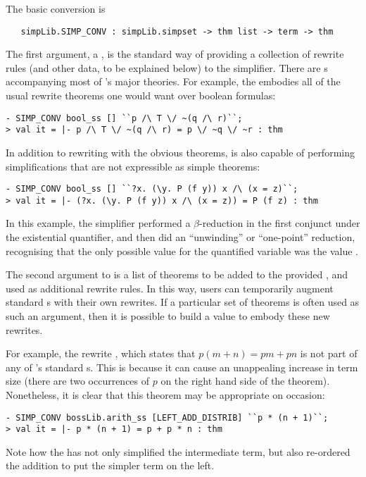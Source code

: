 The basic conversion is
\begin{verbatim}
   simpLib.SIMP_CONV : simpLib.simpset -> thm list -> term -> thm
\end{verbatim}
The first argument, a \simpset, is the standard way of providing a
collection of rewrite rules (and other data, to be explained below) to
the simplifier.  There are \simpset{}s accompanying most of \HOL's
major theories.  For example, the \simpset{} 
embodies all of the usual rewrite theorems one would want over boolean
formulas:
\setcounter{sessioncount}{0}
\begin{session}
\begin{verbatim}
- SIMP_CONV bool_ss [] ``p /\ T \/ ~(q /\ r)``;
> val it = |- p /\ T \/ ~(q /\ r) = p \/ ~q \/ ~r : thm
\end{verbatim}
\end{session}
In addition to rewriting with the obvious theorems,  is
also capable of performing simplifications that are not expressible as
simple theorems:
\begin{session}
\begin{verbatim}
- SIMP_CONV bool_ss [] ``?x. (\y. P (f y)) x /\ (x = z)``;
> val it = |- (?x. (\y. P (f y)) x /\ (x = z)) = P (f z) : thm
\end{verbatim}
\end{session}
In this example, the simplifier performed a $\beta$-reduction in the
first conjunct under the existential quantifier, and then did an
``unwinding'' or ``one-point'' reduction, recognising that the only
possible value for the quantified variable  was the value
.

The second argument to  is a list of theorems to be
added to the provided \simpset, and used as additional rewrite rules.
In this way, users can temporarily augment standard \simpset{}s with
their own rewrites.  If a particular set of theorems is often used as
such an argument, then it is possible to build a \simpset{} value to
embody these new rewrites.

For example, the rewrite , which
states that $p(m + n) = pm + pn$ is not part of any of \HOL's standard
\simpset{}s.  This is because it can cause an unappealing increase in
term size (there are two occurrences of $p$ on the right hand
side of the theorem).  Nonetheless, it is clear that this theorem may
be appropriate on occasion:
\begin{session}
\begin{verbatim}
- SIMP_CONV bossLib.arith_ss [LEFT_ADD_DISTRIB] ``p * (n + 1)``;
> val it = |- p * (n + 1) = p + p * n : thm
\end{verbatim}
\end{session}
Note how the  \simpset{} has not only simplified the
intermediate  term, but also re-ordered the addition to
put the simpler term on the left.

